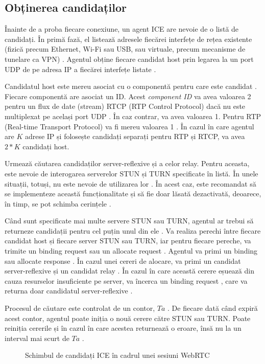 \subsection{Obținerea candidaților}
\indent \par Înainte de a proba fiecare conexiune, un agent ICE are nevoie de o listă de candidați. În primă fază, el listează adresele fiecărei interfețe de rețea existente (fizică precum Ethernet, Wi-Fi sau USB, sau virtuale, precum mecanisme de tunelare ca VPN) \cite{rfc8445}. Agentul obține fiecare candidat host prin legarea la un port UDP de pe adresa IP a fiecărei interfețe listate \cite{rfc8445}. 
\indent \par Candidatul host este mereu asociat cu o componentă pentru care este candidat \cite{rfc8445}. Fiecare componentă are asociat un ID. Acest \textit{component ID} va avea valoarea 2 pentru un flux de date (stream) RTCP (RTP Control Protocol) dacă nu este multiplexat pe același port UDP \cite{rfc8445}. În caz contrar, va avea valoarea 1. Pentru RTP (Real-time Transport Protocol) va fi mereu valoarea 1 \cite{rfc8445}. În cazul în care agentul are \(K\) adrese IP și folosește candidați separați pentru RTP și RTCP, va avea \(2*K\) candidați host.
\indent \par Urmează căutarea candidaților server-reflexive și a celor relay. Pentru aceasta, este nevoie de interogarea serverelor STUN și TURN specificate în listă. În unele situații, totuși, nu este nevoie de utilizarea lor \cite{rfc8445}. În acest caz, este recomandat să se implementeze această funcționalitate și să fie doar lăsată dezactivată, deoarece, în timp, se pot schimba cerințele \cite{rfc8445}. 
\indent \par Când sunt specificate mai multe servere STUN sau TURN, agentul ar trebui să returneze candidații pentru cel puțin unul din ele \cite{rfc8445}. Va realiza perechi între fiecare candidat host și fiecare server STUN sau TURN, iar pentru fiecare pereche, va trimite un binding request sau un allocate request \cite{rfc8445}. Agentul va primi un binding sau allocate response \cite{rfc8445}. În cazul unei cereri de alocare, va primi un candidat server-reflexive și un candidat relay \cite{rfc8445}. În cazul în care această cerere eșuează din cauza resurselor insuficiente pe server, va încerca un binding request , care va returna doar candidatul server-reflexive \cite{rfc8445}.
\indent \par Procesul de căutare este controlat de un contor, \(Ta\) \cite{rfc8445}. De fiecare dată când expiră acest contor, agentul poate iniția o nouă cerere către STUN sau TURN. Poate reiniția cererile și în cazul în care acestea returnează o eroare, însă nu la un interval mai scurt de \(Ta\) \cite{rfc8445}. 
\begin{figure}
    \centering
    \scalebox{0.75}{}
    \caption{Schimbul de candidați ICE în cadrul unei sesiuni WebRTC}
\end{figure}
